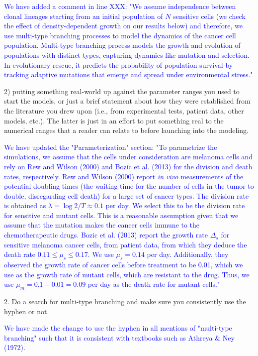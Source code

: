 \documentclass[12pt]{extarticle}
\begin{document}
\textcolor{blue}{ %
We have added a comment in line XXX: "We assume independence between clonal lineages starting from an initial population of $N$ sensitive cells (we check the effect of density-dependent growth on our results below) and therefore, we use multi-type branching processes to model the dynamics of the cancer cell population. Multi-type branching process models the growth and evolution of populations with distinct types, capturing dynamics like mutation and selection. In evolutionary rescue, it predicts the probability of population survival by tracking adaptive mutations that emerge and spread under environmental stress."
}

2) putting something real-world up against the parameter ranges you used to start the models, or just a brief statement about how they were established from the literature you drew upon (i.e., from experimental tests, patient data, other models, etc.). The latter is just in an effort to put something real to the numerical ranges that a reader can relate to before launching into the modeling.

\textcolor{blue}{ %
We have updated the "Parameterization" section: "To parametrize the simulations, we assume that the cells under consideration are melanoma cells and rely on Rew and Wilson (2000) and Bozic et al. (2013) for the division and death rates, respectively. 
Rew and Wilson (2000)  report \emph{in vivo} measurements of the potential doubling times (the waiting time for the number of cells in the tumor to double, disregarding cell death) for a large set of cancer types. The division rate is obtained as $\lambda=\log{2} / T \approx 0.1$ per day. We select this to be the division rate for sensitive and mutant cells. This is a reasonable assumption given that we assume that the mutation makes the cancer cells immune to the chemotherapeutic drugs. 
Bozic et al. (2013) report the growth rate $\Delta_s$ for sensitive melanoma cancer cells, from patient data, from which they deduce the death rate $0.11 \le \mu_s \le 0.17$. We use  $\mu_s=0.14$ per day. Additionally, they observed the growth rate of cancer cells before treatment to be 0.01, which we use as the growth rate of mutant cells, which are resistant to the drug. Thus, we use $\mu_m=0.1-0.01=0.09$ per day as the death rate for mutant cells."
} 

2. Do a search for multi-type branching and make sure you consistently use the hyphen or not.

\textcolor{blue}{%
We have made the change to use the hyphen in all mentions of "multi-type branching" such that it is consistent with textbooks such as Athreya $\&$ Ney (1972).
} 
\end{document}
